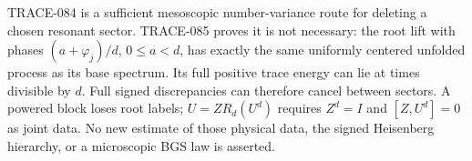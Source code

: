 TRACE-084 is a sufficient mesoscopic number-variance route for deleting a
chosen resonant sector. TRACE-085 proves it is not necessary: the root lift
with phases $(a+\varphi_j)/d$, $0\le a<d$, has exactly the same uniformly
centered unfolded process as its base spectrum. Its full positive trace
energy can lie at times divisible by $d$. Full signed discrepancies can
therefore cancel between sectors. A powered block loses root labels;
$U=ZR_d(U^d)$ requires $Z^d=I$ and $[Z,U^d]=0$ as joint data.
No new estimate of those physical data, the signed Heisenberg hierarchy,
or a microscopic BGS law is asserted.
